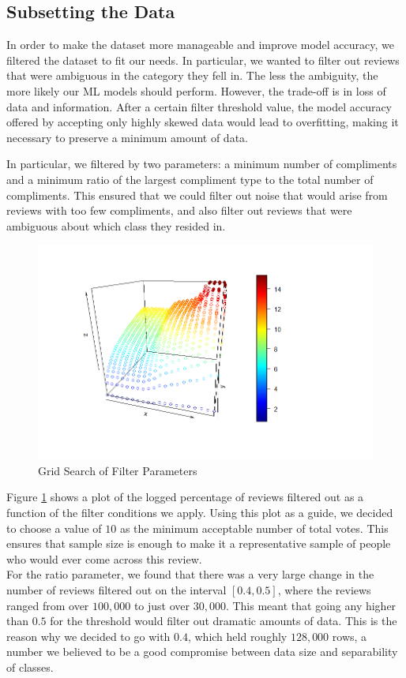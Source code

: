 \documentclass[letterpaper, 12 pt, conference]{ieeeconf}  %
\begin{document}
\subsection{Subsetting the Data}
In order to make the dataset more manageable and improve model accuracy, we filtered the dataset to fit our needs. In particular, we wanted to filter out reviews that were ambiguous in the category they fell in. The less the ambiguity, the more likely our ML models should perform. However, the trade-off is in loss of data and information. After a certain filter threshold value, the model accuracy offered by accepting only highly skewed data would lead to overfitting, making it necessary to preserve a minimum amount of data.

In particular, we filtered by two parameters: a minimum number of compliments and a minimum ratio of the largest compliment type to the total number of compliments. This ensured that we could filter out noise that would arise from reviews with too few compliments, and also filter out reviews that were ambiguous about which class they resided in.

\begin{figure}[h]
	\centering
	\includegraphics[scale=0.45]{3d_plot.png}
	\caption{Grid Search of Filter Parameters}
    \label{param_search}
\end{figure}

Figure \ref{param_search} shows a plot of the logged percentage of reviews filtered out as a function of the filter conditions we apply. Using this plot as a guide, we decided to choose a value of $10$ as the minimum acceptable number of total votes. This ensures that sample size is enough to make it a representative sample of people who would ever come across this review. \\For the ratio parameter, we found that there was a very large change in the number of reviews filtered out on the interval $[0.4, 0.5]$, where the reviews ranged from over $100,000$ to just over $30,000$. This meant that going any higher than $0.5$ for the threshold would filter out dramatic amounts of data. This is the reason why we decided to go with $0.4$, which held roughly $128,000$ rows, a number we believed to be a good compromise between data size and separability of classes. 
\end{document}
